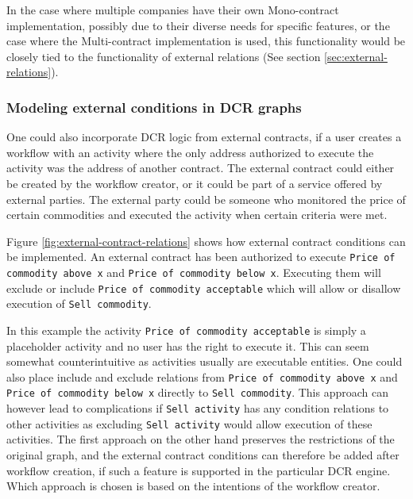 \documentclass{article}
\begin{document}
		In the case where multiple companies have their own Mono-contract implementation, possibly due to their diverse needs for specific features, or the case where the Multi-contract implementation is used, this functionality would be closely tied to the functionality of external relations (See section \ref{sec:external-relations}).

			\subsubsection{Modeling external conditions in DCR graphs}
			One could also incorporate DCR logic from external contracts, if a user creates a workflow with an activity where the only address authorized to execute the activity was the address of another contract.
			The external contract could either be created by the workflow creator, or it could be part of a service offered by external parties.
			The external party could be someone who monitored the price of certain commodities and executed the activity when certain criteria were met.
			
			Figure \ref{fig:external-contract-relations} shows how external contract conditions can be implemented. 
			An external contract has been authorized to execute \texttt{Price of commodity above x} and \texttt{Price of commodity below x}. 
			Executing them will exclude or include \texttt{Price of commodity acceptable} which will allow or disallow execution of \texttt{Sell commodity}.
			
			In this example the activity \texttt{Price of commodity acceptable} is simply a placeholder activity and no user has the right to execute it.
			This can seem somewhat counterintuitive as activities usually are executable entities. 
			One could also place include and exclude relations from \texttt{Price of commodity above x} and \texttt{Price of commodity below x} directly to \texttt{Sell commodity}.
			This approach can however lead to complications if \texttt{Sell activity} has any condition relations to other activities as excluding \texttt{Sell activity} would allow execution of these activities.
			The first approach on the other hand preserves the restrictions of the original graph, and the external contract conditions can therefore be added after workflow creation, if such a feature is supported in the particular DCR engine.
			Which approach is chosen is based on the intentions of the workflow creator.
\end{document}
